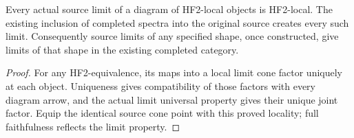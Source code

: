 \begin{proposition}
  \label{prop:actual-local-source-limits}
  \leanok
  Every actual source limit of a diagram of HF2-local objects is HF2-local. The existing inclusion of completed spectra into the original source creates every such limit. Consequently source limits of any specified shape, once constructed, give limits of that shape in the existing completed category.
\end{proposition}
\begin{proof}
  For any HF2-equivalence, its maps into a local limit cone factor uniquely at each object. Uniqueness gives compatibility of those factors with every diagram arrow, and the actual limit universal property gives their unique joint factor. Equip the identical source cone point with this proved locality; full faithfulness reflects the limit property.
  \leanok
\end{proof}

